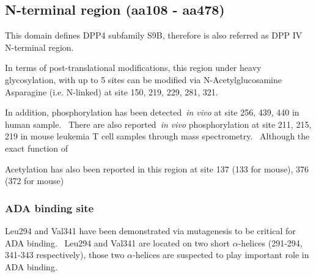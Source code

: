\subsection{N-terminal region (aa108 - aa478)}

This domain defines DPP4 subfamily S9B, therefore is also referred as DPP IV N-terminal region. 

In terms of post-translational modifications, this region under heavy glycosylation, with up to 5 sites can be modified via N-Acetylglucosamine Asparagine (i.e. N-linked) at site 150, 219, 229, 281, 321.~\cite{Rasmussen2003,Thoma2003,Meng2010,Chen2009,Hiramatsu2003} 
\par
In addition, phosphorylation has been detected~\textit{in vivo} at site 256, 439, 440 in human sample.~\cite{Hornbeck2015, Mertins2014} There are also reported~\textit{in vivo} phosphorylation at site 211, 215, 219 in mouse leukemia T cell samples through mass spectrometry.~\cite{Hornbeck2015}  Although the exact function of 
\par
Acetylation has also been reported in this region at site 137 (133 for mouse), 376 (372 for mouse) 

\subsubsection{ADA binding site}
Leu294 and Val341 have been demonstrated via mutagenesis to be critical for ADA binding.~\cite{Abbott_1999} Leu294 and Val341 are located on two short $\alpha$-helices (291-294, 341-343 respectively), those two $\alpha$-helices are suspected to play important role in ADA binding. 